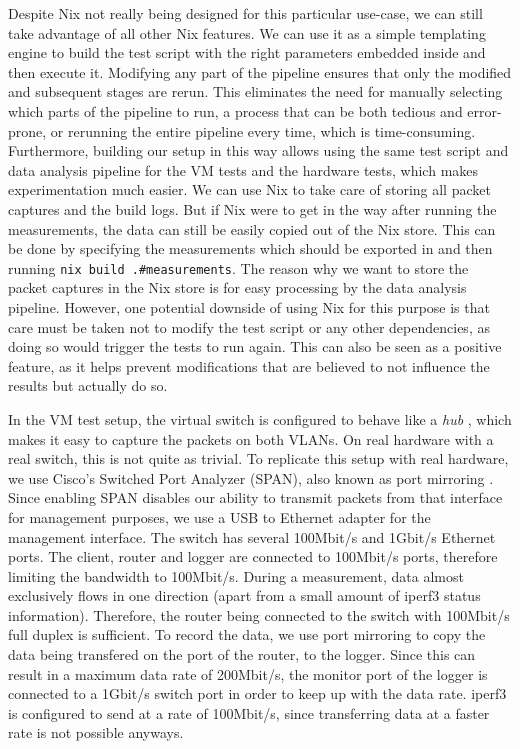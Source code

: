 Despite Nix not really being designed for this particular use-case, we can still take advantage of all other Nix features.
We can use it as a simple templating engine to build the test script with the right parameters embedded inside and then execute it.
Modifying any part of the pipeline ensures that only the modified and subsequent stages are rerun.
This eliminates the need for manually selecting which parts of the pipeline to run, a process that can be both tedious and error-prone, or rerunning the entire pipeline every time, which is time-consuming.
Furthermore, building our setup in this way allows using the same test script and data analysis pipeline for the VM tests and the hardware tests, which makes experimentation much easier.
We can use Nix to take care of storing all packet captures and the build logs.
But if Nix were to get in the way after running the measurements, the data can still be easily copied out of the Nix store.
This can be done by specifying the measurements which should be exported in  and then running \texttt{nix build .#measurements}.
The reason why we want to store the packet captures in the Nix store is for easy processing by the data analysis pipeline.
However, one potential downside of using Nix for this purpose is that care must be taken not to modify the test script or any other dependencies, as doing so would trigger the tests to run again.
This can also be seen as a positive feature, as it helps prevent modifications that are believed to not influence the results but actually do so.

In the VM test setup, the virtual switch is configured to behave like a \textit{hub} \cite{wiki:Ethernet_hub} \cite{NixOS-VM-test-Hub}, which makes it easy to capture the packets on both VLANs.
On real hardware with a real switch, this is not quite as trivial.
To replicate this setup with real hardware, we use Cisco's Switched Port Analyzer (SPAN), also known as port mirroring \cite{cisco-span-tutorial}.
Since enabling SPAN disables our ability to transmit packets from that interface for management purposes, we use a USB to Ethernet adapter for the management interface.
The switch has several 100Mbit/s and 1Gbit/s Ethernet ports.
The client, router and logger are connected to 100Mbit/s ports, therefore limiting the bandwidth to 100Mbit/s.
During a measurement, data almost exclusively flows in one direction (apart from a small amount of iperf3 status information).
Therefore, the router being connected to the switch with 100Mbit/s full duplex is sufficient.
To record the data, we use port mirroring to copy the data being transfered on the port of the router, to the logger.
Since this can result in a maximum data rate of 200Mbit/s, the monitor port of the logger is connected to a 1Gbit/s switch port in order to keep up with the data rate.
iperf3 is configured to send at a rate of 100Mbit/s, since transferring data at a faster rate is not possible anyways.

